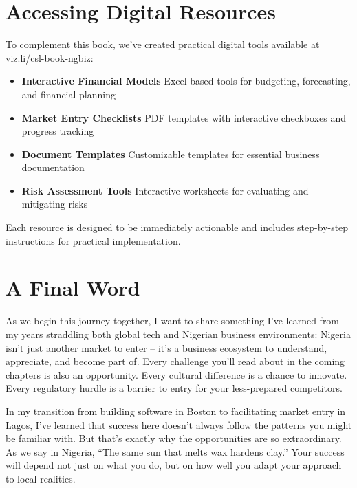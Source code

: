 \section{Accessing Digital Resources}\label{sec:accessing-digital-resources}

To complement this book, we've created practical digital tools available at \href{https://viz.li/csl-book-ngbiz}{viz.li/csl-book-ngbiz}:

\begin{itemize}
    \item \textbf{Interactive Financial Models}
    Excel-based tools for budgeting, forecasting, and financial planning

    \item \textbf{Market Entry Checklists}
    PDF templates with interactive checkboxes and progress tracking

    \item \textbf{Document Templates}
    Customizable templates for essential business documentation

    \item \textbf{Risk Assessment Tools}
    Interactive worksheets for evaluating and mitigating risks
\end{itemize}

Each resource is designed to be immediately actionable and includes step-by-step instructions for practical implementation.

\section{A Final Word}\label{sec:a-final-word}

As we begin this journey together, I want to share something I've learned from my years straddling both global tech and Nigerian business environments: Nigeria isn't just another market to enter – it's a business ecosystem to understand, appreciate, and become part of. Every challenge you'll read about in the coming chapters is also an opportunity. Every cultural difference is a chance to innovate. Every regulatory hurdle is a barrier to entry for your less-prepared competitors.

In my transition from building software in Boston to facilitating market entry in Lagos, I've learned that success here doesn't always follow the patterns you might be familiar with. But that's exactly why the opportunities are so extraordinary. As we say in Nigeria, ``The same sun that melts wax hardens clay.'' Your success will depend not just on what you do, but on how well you adapt your approach to local realities.

